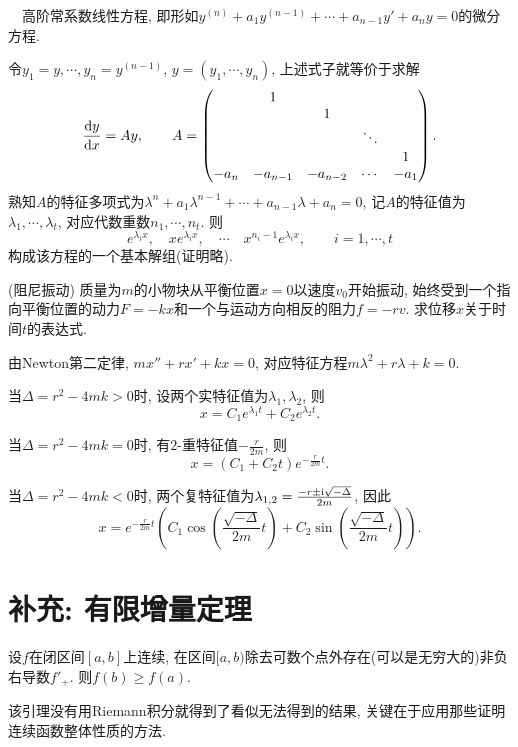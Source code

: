 ~~高阶常系数线性方程, 即形如$y^{(n)}+a_1y^{(n-1)} + \cdots + a_{n-1}y'+a_ny=0$的微分方程. 

令$y_1=y,\cdots ,y_n=y^{(n-1)}$, $y=(y_1,\cdots ,y_n)$, 上述式子就等价于求解$$\frac{\mathop{}\!\mathrm{d} y}{\mathop{}\!\mathrm{d} x} = Ay,\qquad A=\begin{pmatrix}
  & 1 &  &  &   \\
  &  & 1 &  &   \\
  &  &  & \ddots    & \\
  &  &  &    & 1\\
 -a_n & -a_{n-1} & -a_{n-2} & \cdots  & -a_1
\end{pmatrix}.$$
熟知$A$的特征多项式为$\lambda ^n+a_1\lambda ^{n-1} + \cdots + a_{n-1}\lambda +a_n=0$, 记$A$的特征值为$\lambda _1,\cdots ,\lambda _t$, 对应代数重数$n_1,\cdots ,n_t$. 则$$e^{\lambda _ix},\quad xe^{\lambda _ix}, \quad \cdots \quad x^{n_i-1}e^{\lambda _ix},\qquad i=1,\cdots ,t$$
构成该方程的一个基本解组(证明略). 

\begin{example}
	(阻尼振动) 质量为$m$的小物块从平衡位置$x=0$以速度$v_0$开始振动, 始终受到一个指向平衡位置的动力$F=-kx$和一个与运动方向相反的阻力$f=-r v$. 求位移$x$关于时间$t$的表达式. 
\end{example}
\begin{solution}
	由Newton第二定律, $mx''+rx'+kx=0$, 对应特征方程$m\lambda ^2+r\lambda +k=0$. 
	
	当$\Delta = r^2-4mk>0$时, 设两个实特征值为$\lambda _1,\lambda _2$, 则$$x=C_1e^{\lambda _1t}+C_2e^{\lambda _2t}.$$
	
	当$\Delta = r^2-4mk=0$时, 有$2$-重特征值$-\frac{r}{2m}$, 则$$x=(C_1+C_2t)e^{-\frac{r}{2m}t}.$$
	
	当$\Delta = r^2-4mk<0$时, 两个复特征值为$\lambda_{1,2}=\frac{-r\pm \mathrm{i} \sqrt{-\Delta}}{2m}$, 因此$$x=e^{-\frac{r}{2m}t}\left( C_1\cos \left( \frac{\sqrt{-\Delta}}{2m}t \right)+C_2\sin \left( \frac{\sqrt{-\Delta}}{2m}t \right) \right).$$
\end{solution}

\newpage
\section{补充: 有限增量定理}

\begin{lemma}{}
	设$f$在闭区间$[a,b]$上连续, 在区间$[a,b)$除去可数个点外存在(可以是无穷大的)非负右导数$f'_+$. 则$f(b) \geq f(a)$. 
\end{lemma}
\begin{remark}
	该引理没有用Riemann积分就得到了看似无法得到的结果, 关键在于应用那些证明连续函数整体性质的方法. 
\end{remark}











































